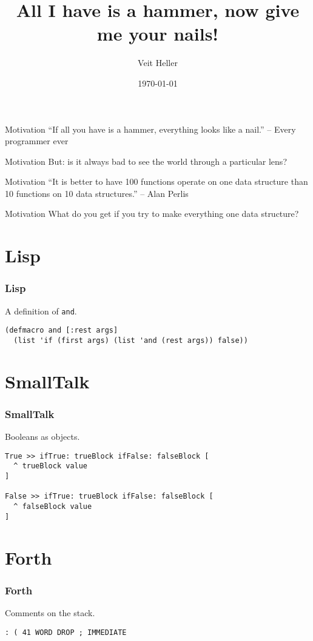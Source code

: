 \documentclass[aspectratio=169]{beamer}
\title{All I have is a hammer, now give me your nails!}
\date{\today}
\author{Veit Heller}
\institute{EnthusiastiCon 2020}
\begin{document}
  \maketitle
  \begin{frame}{Motivation}
    “If all you have is a hammer, everything looks like a nail.” -- Every
    programmer ever
  \end{frame}
  \begin{frame}{Motivation}
    But: is it always bad to see the world through a particular lens?
  \end{frame}
  \begin{frame}{Motivation}
    “It is better to have 100 functions operate on one data structure than 10
    functions on 10 data structures.” -- Alan Perlis
  \end{frame}
  \begin{frame}{Motivation}
    What do you get if you try to make everything one data structure?
  \end{frame}
  \section{Lisp}
  \begin{frame}[fragile]
    \frametitle{Lisp}
    \begin{listing}[H]
      \caption{A definition of \texttt{and}.}
      \begin{verbatim}
(defmacro and [:rest args]
  (list 'if (first args) (list 'and (rest args)) false))
      \end{verbatim}
    \end{listing}
  \end{frame}
  \section{SmallTalk}
  \begin{frame}[fragile]
    \frametitle{SmallTalk}
    \begin{listing}[H]
      \caption{Booleans as objects.}
      \begin{verbatim}
True >> ifTrue: trueBlock ifFalse: falseBlock [
  ^ trueBlock value
]

False >> ifTrue: trueBlock ifFalse: falseBlock [
  ^ falseBlock value
]
      \end{verbatim}
    \end{listing}
  \end{frame}
  \section{Forth}
  \begin{frame}[fragile]
    \frametitle{Forth}
    \begin{listing}[H]
      \caption{Comments on the stack.}
      \begin{verbatim}
: ( 41 WORD DROP ; IMMEDIATE
      \end{verbatim}
    \end{listing}
  \end{frame}
\end{document}

